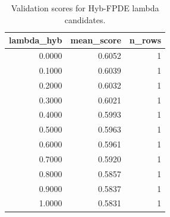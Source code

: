 \begin{table}[t]
\caption{Validation scores for Hyb-FPDE lambda candidates.}
\label{tab:lambda_distribution_computed}
\centering
\begin{tabular}{rrr}
\toprule
lambda\_hyb & mean\_score & n\_rows \\
\midrule
0.0000 & 0.6052 & 1 \\
0.1000 & 0.6039 & 1 \\
0.2000 & 0.6032 & 1 \\
0.3000 & 0.6021 & 1 \\
0.4000 & 0.5993 & 1 \\
0.5000 & 0.5963 & 1 \\
0.6000 & 0.5961 & 1 \\
0.7000 & 0.5920 & 1 \\
0.8000 & 0.5857 & 1 \\
0.9000 & 0.5837 & 1 \\
1.0000 & 0.5831 & 1 \\
\bottomrule
\end{tabular}

\end{table}
